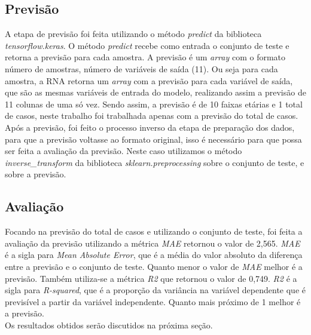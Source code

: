 \documentclass[
	article,			%
	11pt,				%
	a4paper,			%
	chapter=TITLE,		%
	section=TITLE,		%
	subsection=TITLE,	%
	subsubsection=TITLE %
	english,			%
	brazil,				%
	sumario=tradicional
	]{abntex2}
\begin{document}
\subsection{Previsão}
A etapa de previsão foi feita utilizando o método \textit{predict} da biblioteca \textit{tensorflow.keras}. O método \textit{predict} recebe como entrada o conjunto de teste e retorna a previsão para cada amostra. A previsão é um \textit{array} com o formato número de amostras, número de variáveis de saída (11). Ou seja para cada amostra, a RNA retorna um \textit{array} com a previsão para cada variável de saída, que são as mesmas variáveis de entrada do modelo, realizando assim a previsão de 11 colunas de uma só vez. Sendo assim, a previsão é de 10 faixas etárias e 1 total de casos, neste trabalho foi trabalhada apenas com a previsão do total de casos. Após a previsão, foi feito o processo inverso da etapa de preparação dos dados, para que a previsão voltasse ao formato original, isso é necessário para que possa ser feita a avaliação da previsão. Neste caso utilizamos o método \textit{inverse\_transform} da biblioteca \textit{sklearn.preprocessing} sobre o conjunto de teste, e sobre a previsão. 
\subsection{Avaliação}
Focando na previsão do total de casos e utilizando o conjunto de teste, foi feita a avaliação da previsão utilizando a métrica \textit{MAE} retornou o valor de 2,565. \textit{MAE} é a sigla para \textit{Mean Absolute Error}, que é a média do valor absoluto da diferença entre a previsão e o conjunto de teste. Quanto menor o valor de \textit{MAE} melhor é a previsão.
Também utiliza-se a métrica \textit{R2} que retornou o valor de 0,749. \textit{R2} é a sigla para \textit{R-squared}, que é a proporção da variância na variável dependente que é previsível a partir da variável independente. Quanto mais próximo de 1 melhor é a previsão.
\\ \indent
Os resultados obtidos serão discutidos na próxima seção.
\end{document}
